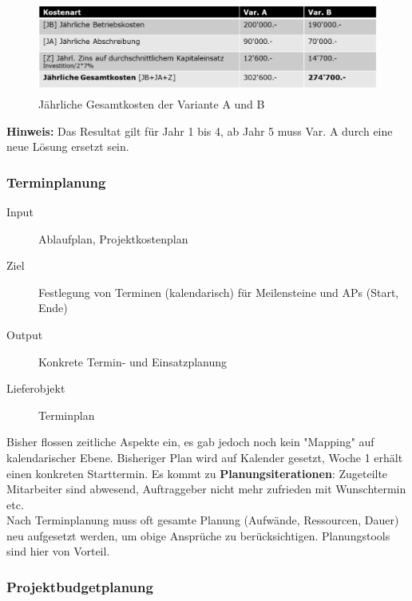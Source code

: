 \documentclass[a4paper]{article}
\begin{document}
\newpage
			
			\begin{figure}[!htb]
				\centering
				\includegraphics[height=3cm]{img/pm/kosten_result.png}
				\caption{Jährliche Gesamtkosten der Variante A und B}
				\label{fig:pm_kosten_result}
			\end{figure}
			\noindent
			\textbf{Hinweis:} Das Resultat gilt für Jahr 1 bis 4, ab Jahr 5 muss Var. A durch eine neue Lösung ersetzt sein.
			
		\subsubsection{Terminplanung}
		
		\begin{description}
			\item[Input] Ablaufplan, Projektkostenplan
			\item[Ziel] Festlegung von Terminen (kalendarisch) für Meilensteine und APs (Start, Ende)
			\item[Output] Konkrete Termin- und Einsatzplanung
			\item[Lieferobjekt] Terminplan
		\end{description}
	
		Bisher flossen zeitliche Aspekte ein, es gab jedoch noch kein "Mapping" auf kalendarischer Ebene.
		Bisheriger Plan wird auf Kalender gesetzt, Woche 1 erhält einen konkreten Starttermin.
		Es kommt zu \textbf{Planungsiterationen}: Zugeteilte Mitarbeiter sind abwesend, Auftraggeber nicht mehr zufrieden mit Wunschtermin etc.\\
		Nach Terminplanung muss oft gesamte Planung (Aufwände, Ressourcen, Dauer) neu aufgesetzt werden, um obige Ansprüche zu berücksichtigen.
		Planungstools sind hier von Vorteil.
		
		\subsubsection{Projektbudgetplanung}
		
\end{document}

